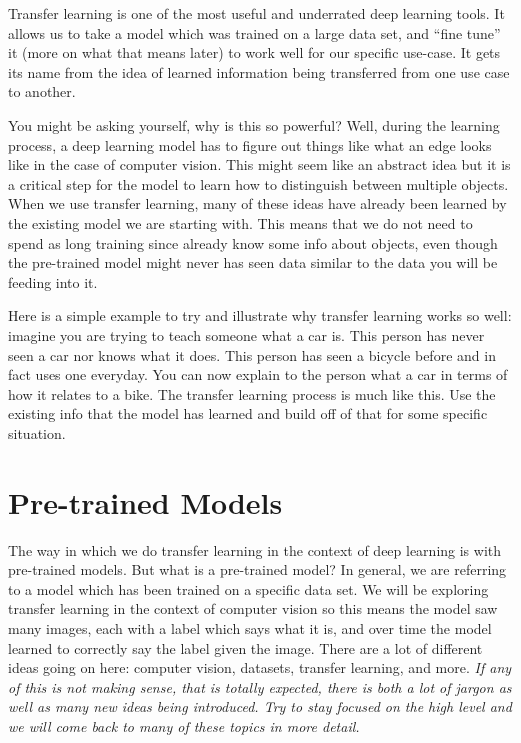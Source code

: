 \documentclass[
  notoc %
]{tufte-book}
\begin{document}
Transfer learning is one of the most useful and underrated deep learning
tools. It allows us to take a model which was trained on a large data
set, and ``fine tune'' it (more on what that means later) to work well
for our specific use-case. It gets its name from the idea of learned
information being transferred from one use case to another.

You might be asking yourself, why is this so powerful? Well, during the
learning process, a deep learning model has to figure out things like
what an edge looks like in the case of computer vision. This might seem
like an abstract idea but it is a critical step for the model to learn
how to distinguish between multiple objects. When we use transfer
learning, many of these ideas have already been learned by the existing
model we are starting with. This means that we do not need to spend as
long training since already know some info about objects, even though
the pre-trained model might never has seen data similar to the data you
will be feeding into it.

Here is a simple example to try and illustrate why transfer learning
works so well: imagine you are trying to teach someone what a car is.
This person has never seen a car nor knows what it does. This person has
seen a bicycle before and in fact uses one everyday. You can now explain
to the person what a car in terms of how it relates to a bike. The
transfer learning process is much like this. Use the existing info that
the model has learned and build off of that for some specific situation.

\hypertarget{sec:pre-trained_models}{%
\section{Pre-trained Models}\label{sec:pre-trained_models}}

The way in which we do transfer learning in the context of deep learning
is with pre-trained models. But what is a pre-trained model? In general,
we are referring to a model which has been trained on a specific data
set. We will be exploring transfer learning in the context of computer
vision so this means the model saw many images, each with a label which
says what it is, and over time the model learned to correctly say the
label given the image. There are a lot of different ideas going on here:
computer vision, datasets, transfer learning, and more. \emph{If any of
this is not making sense, that is totally expected, there is both a lot
of jargon as well as many new ideas being introduced. Try to stay
focused on the high level and we will come back to many of these topics
in more detail.}
\end{document}
